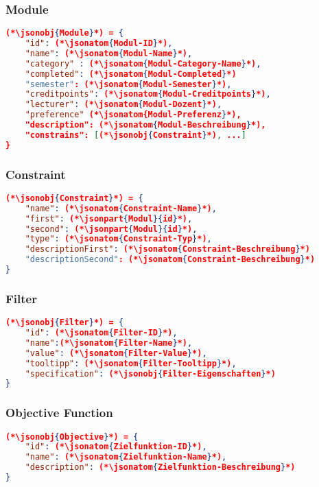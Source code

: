 \subsubsection{Module}
\begin{lstlisting}[language=json,firstnumber=1]
(*\jsonobj{Module}*) = {
	"id": (*\jsonatom{Modul-ID}*),
	"name": (*\jsonatom{Modul-Name}*),
	"category" : (*\jsonatom{Modul-Category-Name}*),
	"completed": (*\jsonatom{Modul-Completed}*)
	"semester": (*\jsonatom{Modul-Semester}*),
	"creditpoints": (*\jsonatom{Modul-Creditpoints}*),
	"lecturer": (*\jsonatom{Modul-Dozent}*),
	"preference" (*\jsonatom{Modul-Preferenz}*),
	"description": (*\jsonatom{Modul-Beschreibung}*),	
	"constrains": [(*\jsonobj{Constraint}*), ...]	
}
\end{lstlisting}

\subsubsection{Constraint}
\begin{lstlisting}[language=json,firstnumber=1]
(*\jsonobj{Constraint}*) = {
	"name": (*\jsonatom{Constraint-Name}*),
	"first": (*\jsonpart{Modul}{id}*),
	"second": (*\jsonpart{Modul}{id}*),
	"type": (*\jsonatom{Constraint-Typ}*),
	"descriptionFirst": (*\jsonatom{Constraint-Beschreibung}*)
	"descriptionSecond": (*\jsonatom{Constraint-Beschreibung}*)	
}
\end{lstlisting}

\subsubsection{Filter}
\begin{lstlisting}[language=json,firstnumber=1]
(*\jsonobj{Filter}*) = {
	"id": (*\jsonatom{Filter-ID}*),
	"name":(*\jsonatom{Filter-Name}*),
	"value": (*\jsonatom{Filter-Value}*),
	"tooltipp": (*\jsonatom{Filter-Tooltipp}*),
	"specification": (*\jsonobj{Filter-Eigenschaften}*)
}
\end{lstlisting}

\subsubsection{Objective Function}
\begin{lstlisting}[language=json,firstnumber=1]
(*\jsonobj{Objective}*) = {
	"id": (*\jsonatom{Zielfunktion-ID}*),
	"name": (*\jsonatom{Zielfunktion-Name}*),
	"description": (*\jsonatom{Zielfunktion-Beschreibung}*)
}
\end{lstlisting}

